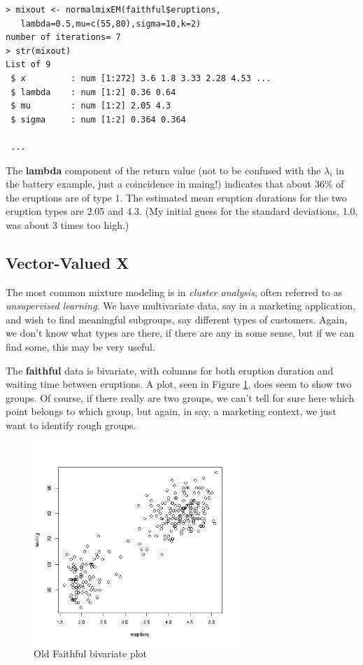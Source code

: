 \documentclass[11pt]{article}
\begin{document}
\begin{lstlisting}
> mixout <- normalmixEM(faithful$eruptions,
   lambda=0.5,mu=c(55,80),sigma=10,k=2) 
number of iterations= 7
> str(mixout)
List of 9
 $ x         : num [1:272] 3.6 1.8 3.33 2.28 4.53 ...
 $ lambda    : num [1:2] 0.36 0.64
 $ mu        : num [1:2] 2.05 4.3
 $ sigma     : num [1:2] 0.364 0.364

 ...
\end{lstlisting}

The \textbf{lambda} component of the return value (not to be confused
with the $\lambda_i$ in the battery example, just a coincidence in
maing!) indicates that about 36\% of the eruptions are of type 1.  The
estimated mean eruption durations for the two eruption types are 2.05
and 4.3.  (My initial guess for the standard deviations, 1.0, was about
3 times too high.)

\subsection{Vector-Valued X}

The most common mixture modeling is in \textit{cluster analysis}, often
referred to as \textit{unsupervised learning}.  We have multivariate
data, say in a marketing application, and wish to find meaningful
subgroups, say different types of customers.  Again, we don't know what
types are there, if there are any in some sense, but if we can find
some, this may be very useful.

The \textbf{faithful} data is bivariate, with columns for both eruption
duration and waiting time between eruptions.  A plot, seen in Figure
\ref{bivariatefaithful}, does seem to show two groups.  Of course, if
there really are two groups, we can't tell for sure here which point
belongs to which group, but again, in say, a marketing context, we just
want to identify rough groups.  

\begin{figure}[tb]
\centerline{
\includegraphics[width=3.0in]{BivarFaithful.png}
}
\caption{Old Faithful bivariate plot}
\label{bivariatefaithful}
\end{figure}
\end{document}
